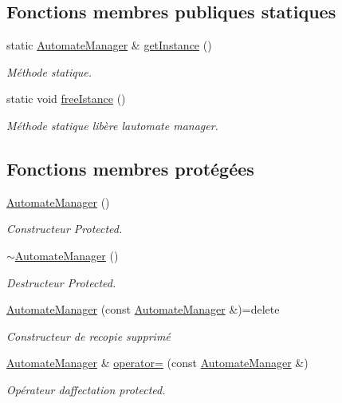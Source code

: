 \subsection*{Fonctions membres publiques statiques}
\begin{DoxyCompactItemize}
\item 
static \hyperlink{class_automate_manager}{Automate\+Manager} \& \hyperlink{class_automate_manager_aea2798eaed147913d2ca18090147fb57}{get\+Instance} ()
\begin{DoxyCompactList}\small\item\em Méthode statique. \end{DoxyCompactList}\item 
static void \hyperlink{class_automate_manager_a586e331de853505a7f6a7c8d50a42248}{free\+Istance} ()
\begin{DoxyCompactList}\small\item\em Méthode statique libère l\textquotesingle{}automate manager. \end{DoxyCompactList}\end{DoxyCompactItemize}
\subsection*{Fonctions membres protégées}
\begin{DoxyCompactItemize}
\item 
\hyperlink{class_automate_manager_a75225270782fb3b8bf593c9f8a0787fa}{Automate\+Manager} ()
\begin{DoxyCompactList}\small\item\em Constructeur Protected. \end{DoxyCompactList}\item 
\hyperlink{class_automate_manager_a8733cbdcc283258677bcf4c9cdf26384}{$\sim$\+Automate\+Manager} ()
\begin{DoxyCompactList}\small\item\em Destructeur Protected. \end{DoxyCompactList}\item 
\hyperlink{class_automate_manager_a855de28e9c3f99ae576f8ce217779af1}{Automate\+Manager} (const \hyperlink{class_automate_manager}{Automate\+Manager} \&)=delete
\begin{DoxyCompactList}\small\item\em Constructeur de recopie supprimé \end{DoxyCompactList}\item 
\hyperlink{class_automate_manager}{Automate\+Manager} \& \hyperlink{class_automate_manager_aa8210055a20404b52d77d6338b17edcd}{operator=} (const \hyperlink{class_automate_manager}{Automate\+Manager} \&)
\begin{DoxyCompactList}\small\item\em Opérateur d\textquotesingle{}affectation protected. \end{DoxyCompactList}\end{DoxyCompactItemize}
